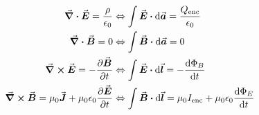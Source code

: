 

\vspace*{\fill}
\centering

\begin{align*}
    \grad \vdot \va*{E} = \frac{\rho}{\epsilon_0} &\Leftrightarrow \int \va*{E} \vdot \dd{\va*{a}} = \frac{Q_{\rm enc}}{\epsilon_0} \\
    \grad \vdot \va*{B} = 0 &\Leftrightarrow \int \va*{B} \vdot \dd{\va*{a}} = 0 \\
    \grad \cross \va*{E} = -\pdv{\va*{B}}{t} &\Leftrightarrow \int \va*{E} \vdot \dd{\va*{l}} = -\dv{\Phi_{B}}{t} \\
    \grad \cross \va*{B} = \mu_0 \va*{J} + \mu_0\epsilon_0\pdv{\va*{E}}{t} & \Leftrightarrow \int \va*{B} \vdot \dd{\va*{l}} = \mu_0I_{\rm enc} + \mu_0\epsilon_0\dv{\Phi_{E}}{t}
\end{align*}

\centering
\vspace*{\fill}

